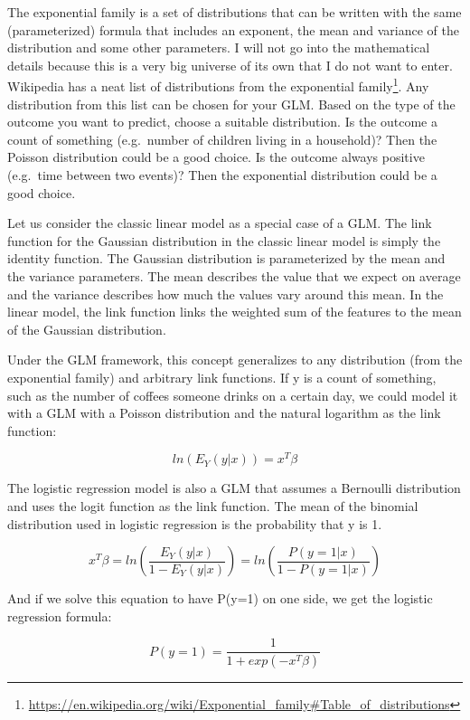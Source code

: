 \documentclass[
  12pt,
]{krantz}
\renewcommand{\href}[2]{#2\footnote{\url{#1}}}
\begin{document}
The exponential family is a set of distributions that can be written with the same (parameterized) formula that includes an exponent, the mean and variance of the distribution and some other parameters.
I will not go into the mathematical details because this is a very big universe of its own that I do not want to enter.
Wikipedia has a neat \href{https://en.wikipedia.org/wiki/Exponential_family\#Table_of_distributions}{list of distributions from the exponential family}.
Any distribution from this list can be chosen for your GLM.
Based on the type of the outcome you want to predict, choose a suitable distribution.
Is the outcome a count of something (e.g.~number of children living in a household)?
Then the Poisson distribution could be a good choice.
Is the outcome always positive (e.g.~time between two events)?
Then the exponential distribution could be a good choice.

Let us consider the classic linear model as a special case of a GLM.
The link function for the Gaussian distribution in the classic linear model is simply the identity function.
The Gaussian distribution is parameterized by the mean and the variance parameters.
The mean describes the value that we expect on average and the variance describes how much the values vary around this mean.
In the linear model, the link function links the weighted sum of the features to the mean of the Gaussian distribution.

Under the GLM framework, this concept generalizes to any distribution (from the exponential family) and arbitrary link functions.
If y is a count of something, such as the number of coffees someone drinks on a certain day, we could model it with a GLM with a Poisson distribution and the natural logarithm as the link function:

\[ln(E_Y(y|x))=x^{T}\beta\]

The logistic regression model is also a GLM that assumes a Bernoulli distribution and uses the logit function as the link function.
The mean of the binomial distribution used in logistic regression is the probability that y is 1.

\[x^{T}\beta=ln\left(\frac{E_Y(y|x)}{1-E_Y(y|x)}\right)=ln\left(\frac{P(y=1|x)}{1-P(y=1|x)}\right)\]

And if we solve this equation to have P(y=1) on one side, we get the logistic regression formula:

\[P(y=1)=\frac{1}{1+exp(-x^{T}\beta)}\]
\end{document}
